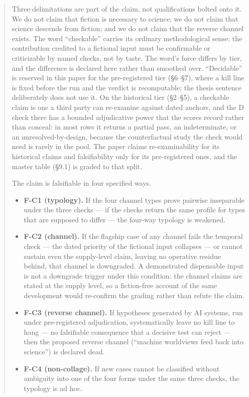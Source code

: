 \documentclass[11pt,a4paper]{article}
\begin{document}
\begin{abstract}
Three delimitations are part of the claim, not qualifications bolted onto it. We do not claim that fiction is necessary to science; we do not claim that science descends from fiction; and we do not claim that the reverse channel exists. The word ``checkable'' carries its ordinary methodological sense: the contribution credited to a fictional input must be confirmable or criticizable by named checks, not by taste. The word's force differs by tier, and the difference is declared here rather than smoothed over. ``Decidable'' is reserved in this paper for the pre-registered tier (§6–§7), where a kill line is fixed before the run and the verdict is recomputable; the thesis sentence deliberately does not use it. On the historical tier (§2–§5), a checkable claim is one a third party can re-examine against dated anchors, and the D check there has a bounded adjudicative power that the scores record rather than conceal: in most rows it returns a partial pass, an indeterminate, or an unresolved-by-design, because the counterfactual study the check would need is rarely in the pool. The paper claims re-examinability for its historical claims and falsifiability only for its pre-registered ones, and the master table (§9.1) is graded to that split.

The claim is falsifiable in four specified ways.

\begin{itemize}[leftmargin=1.6em,itemsep=2pt,parsep=0pt,topsep=3pt]
\item \textbf{F-C1 (typology).} If the four channel types prove pairwise inseparable under the three checks — if the checks return the same profile for types that are supposed to differ — the four-way typology is weakened.
\item \textbf{F-C2 (channel).} If the flagship case of any channel fails the temporal check — the dated priority of the fictional input collapses — or cannot sustain even the supply-level claim, leaving no operative residue behind, that channel is downgraded. A demonstrated dispensable input is not a downgrade trigger under this condition: the channel claims are stated at the supply level, so a fiction-free account of the same development would re-confirm the grading rather than refute the claim.
\item \textbf{F-C3 (reverse channel).} If hypotheses generated by AI systems, run under pre-registered adjudication, systematically leave no kill line to hang — no falsifiable consequence that a decisive test can reject — then the proposed reverse channel (``machine worldviews feed back into science'') is declared dead.
\item \textbf{F-C4 (non-collage).} If new cases cannot be classified without ambiguity into one of the four forms under the same three checks, the typology is ad hoc.
\end{itemize}


\end{abstract}
\end{document}
